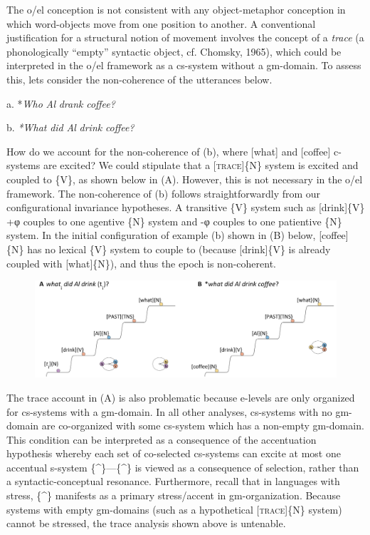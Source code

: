    The o/el conception is not consistent with any object-metaphor conception in which word-objects move from one position to another. A conventional justification for a structural notion of movement involves the concept of a \textit{trace} (a phonologically “empty” syntactic object, cf. Chomsky, 1965), which could be interpreted in the o/el framework as a cs-system without a gm-domain. To assess this, lets consider the non-coherence of the utterances below.

  a.  *\textit{Who} \textit{Al} \textit{drank} \textit{coffee?}

  b.  \textit{*What} \textit{did} \textit{Al} \textit{drink} \textit{coffee?}

  How do we account for the non-coherence of (b), where [what] and [coffee] c-systems are excited?  We could stipulate that a [\textsc{trace}]\{N\} system is excited and coupled to \{V\}, as shown below in (A). However, this is not necessary in the o/el framework. The non-coherence of (b) follows straightforwardly from our configurational invariance hypotheses. A transitive \{V\} system such as [drink]\{V\} +φ couples to one agentive \{N\} system and -φ couples to one patientive \{N\} system. In the initial configuration of example (b) shown in (B) below, [coffee]\{N\} has no lexical \{V\} system to couple to (because [drink]\{V\} is already coupled with [what]\{N\}), and thus the epoch is non-coherent.

  
\begin{figure}
\includegraphics[width=\textwidth]{figures/Tilsen-img161.png}
\caption{\missingcaption}
\label{fig:}
\end{figure}
 

  The trace account in (A) is also problematic because e-levels are only organized for cs-systems with a gm-domain. In all other analyses, cs-systems with no gm-domain are co-organized with some cs-system which has a non-empty gm-domain. This condition can be interpreted as a consequence of the accentuation hypothesis whereby each set of co-selected cs-systems can excite at most one accentual s-system \{\^{}\}—\{\^{}\} is viewed as a consequence of selection, rather than a syntactic-conceptual resonance. Furthermore, recall that in languages with stress, \{\^{}\} manifests as a primary stress/accent in gm-organization. Because systems with empty gm-domains (such as a hypothetical [\textsc{trace}]\{N\} system) cannot be stressed, the trace analysis shown above is untenable.

